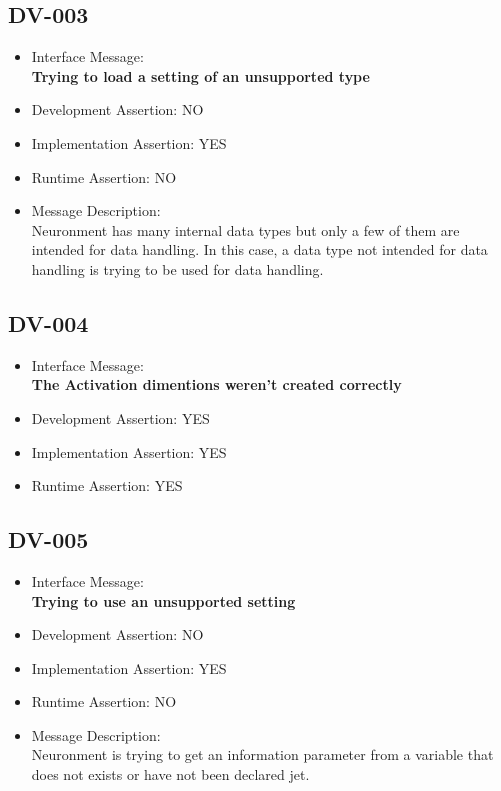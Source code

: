 \subsection{DV-003}
\begin{itemize}
  \item Interface Message:\\[1em]
    \textbf{Trying to load a setting of an unsupported type}
  \item Development Assertion: NO
  \item Implementation Assertion: YES
  \item Runtime Assertion: NO
  \item Message Description:\\[1em]
    Neuronment has many internal data types but only a few of them are intended for data handling. In this case, a data type not intended for data handling is trying to be used for data handling.
\end{itemize}

\subsection{DV-004}
\begin{itemize}
  \item Interface Message:\\[1em]
    \textbf{The Activation dimentions weren't created correctly}
  \item Development Assertion: YES
  \item Implementation Assertion: YES
  \item Runtime Assertion: YES
\end{itemize}

\subsection{DV-005}
\begin{itemize}
  \item Interface Message:\\[1em]
    \textbf{Trying to use an unsupported setting}
  \item Development Assertion: NO
  \item Implementation Assertion: YES
  \item Runtime Assertion: NO
  \item Message Description:\\[1em]
    Neuronment is trying to get an information parameter from a variable that does not exists or have not been declared jet.
\end{itemize}

